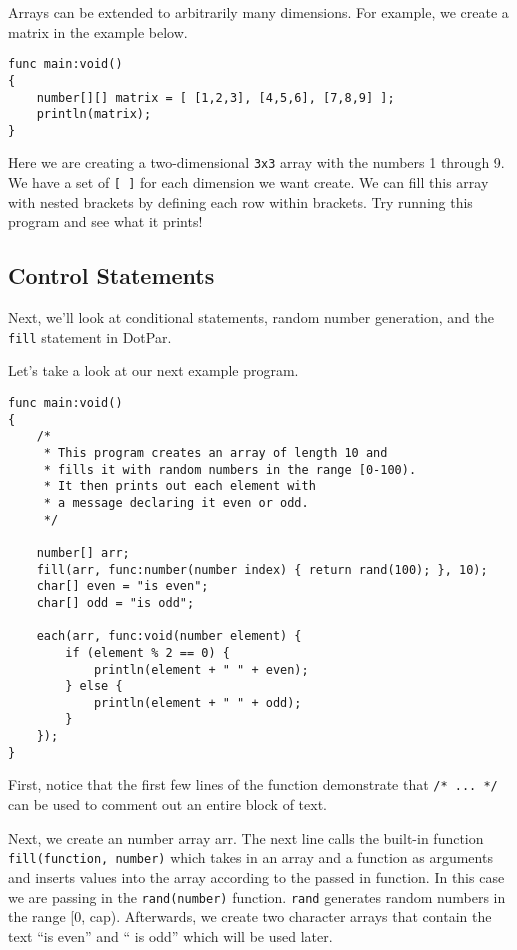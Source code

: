 Arrays can be extended to arbitrarily many dimensions. For example, we create a
matrix in the example below.

\begin{verbatim}
func main:void()
{
    number[][] matrix = [ [1,2,3], [4,5,6], [7,8,9] ];
    println(matrix);
}
\end{verbatim}

Here we are creating a two-dimensional \verb=3x3= array with the numbers 1
through 9.  We have a  set of \verb=[ ]= for each dimension we want create.  We
can fill this array with nested brackets by defining each row within brackets.
Try running this program and see what it prints!

\subsection{Control Statements}

Next, we'll look at conditional statements, random number generation, and the
\verb=fill= statement in DotPar. 

Let's take a look at our next example program.

\begin{verbatim}
func main:void()
{
    /*
     * This program creates an array of length 10 and
     * fills it with random numbers in the range [0-100).
     * It then prints out each element with
     * a message declaring it even or odd.
     */

    number[] arr;
    fill(arr, func:number(number index) { return rand(100); }, 10);
    char[] even = "is even";
    char[] odd = "is odd";

    each(arr, func:void(number element) {
        if (element % 2 == 0) {
            println(element + " " + even);
        } else {
            println(element + " " + odd);
        }
    });
}
\end{verbatim}

First, notice that the first few lines of the function demonstrate that
\verb=/* ... */= can be used to comment out an entire block of text.

Next, we create an number array arr. The next line calls the built-in function
\verb=fill(function, number)= which takes in an array and a function as
arguments and inserts values into the array according to the passed in function.
In this case we are passing in the \verb=rand(number)= function. \verb=rand=
generates random numbers in the range [0, cap). Afterwards, we create two
character arrays that contain the text ``is even'' and `` is odd'' which will
be used later.

